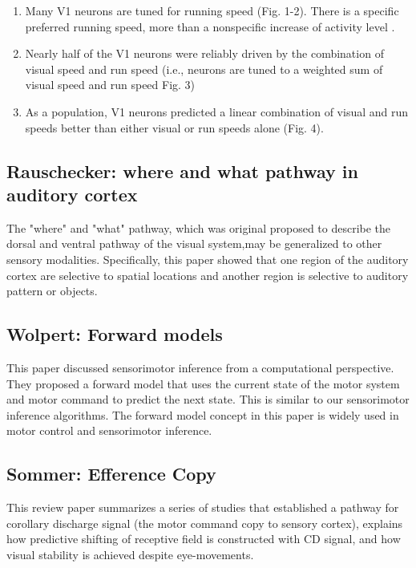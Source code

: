 \documentclass{article} %
\begin{document}
\begin{enumerate}
\item Many V1 neurons are tuned for running speed (Fig. 1-2). There is a specific preferred 
running speed, more than a nonspecific increase of activity level \cite{Niell2010}.
\item Nearly half of the V1 neurons were reliably driven by the combination of visual speed and 
run speed (i.e., neurons are tuned to a weighted sum of visual speed and run speed Fig. 3)
\item As a population, V1 neurons predicted a linear combination of visual and run 
speeds better than either visual or run speeds alone (Fig. 4).
\end{enumerate}

\subsection{Rauschecker: where and what pathway in auditory cortex}

The "where" and "what" pathway, which was original proposed to describe the 
dorsal and ventral pathway of the visual system,may be generalized to other sensory 
modalities. Specifically, this paper \cite{Rauschecker2000} 
showed that one region of the auditory cortex are selective to spatial locations and 
another region is selective to auditory pattern or objects. 


\subsection{Wolpert: Forward models}

This paper \cite{Wolpert1996} discussed sensorimotor inference from a
computational perspective. They proposed a forward model that uses the current
state of the motor system and motor command to predict the next state. This is
similar to our sensorimotor inference algorithms. The forward model concept in
this paper is widely used in motor control and sensorimotor inference.

\subsection{Sommer: Efference Copy}

This review paper \cite{Sommer2006} summarizes a series of studies that
established a  pathway for corollary discharge signal (the motor command copy to
sensory cortex), explains how predictive shifting of receptive field is
constructed with CD signal, and how visual stability is achieved despite
eye-movements.



%

\end{document}
